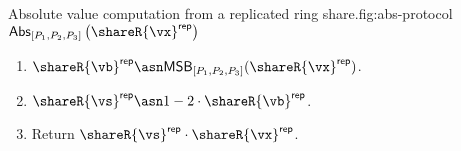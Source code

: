 \begin{Boxfig}{Absolute value computation from a replicated ring share.}{fig:abs-protocol}
  {$\mathsf{Abs}_{[P_1, P_2, P_3]} \left( \shareR{\vx}^{\mathsf{rep}} \right)$}
  \begin{enumerate}
    \item $\shareR{\vb}^{\mathsf{rep}} \asn \mathsf{MSB}_{[P_1, P_2, P_3]}(\shareR{\vx}^{\mathsf{rep}})$.
    \item $\shareR{\vs}^{\mathsf{rep}} \asn 1 - 2 \cdot \shareR{\vb}^{\mathsf{rep}}$.
    \item Return $\shareR{\vs}^{\mathsf{rep}} \cdot \shareR{\vx}^{\mathsf{rep}}$.
  \end{enumerate}

\end{Boxfig}

